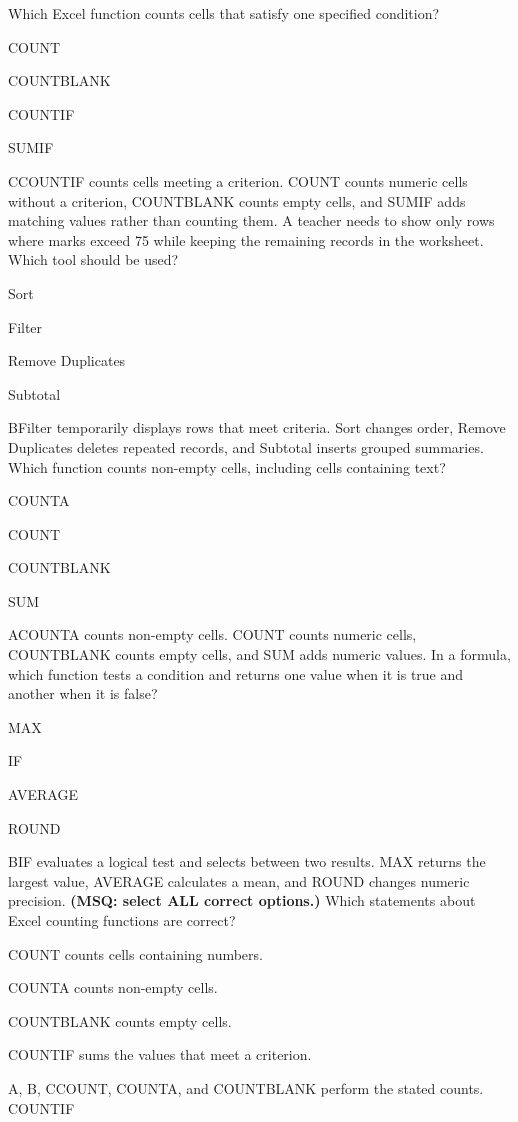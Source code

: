 \begin{enumerate}[label=\textbf{Q\arabic*.}, leftmargin=*]
  {Which Excel function counts cells that satisfy one specified condition?}
  {\item COUNT
   \item COUNTBLANK
   \item COUNTIF
   \item SUMIF}
  {C}{COUNTIF counts cells meeting a criterion. COUNT counts numeric cells
  without a criterion, COUNTBLANK counts empty cells, and SUMIF adds matching
  values rather than counting them.}
  {A teacher needs to show only rows where marks exceed 75 while keeping the
  remaining records in the worksheet. Which tool should be used?}
  {\item Sort
   \item Filter
   \item Remove Duplicates
   \item Subtotal}
  {B}{Filter temporarily displays rows that meet criteria. Sort changes order,
  Remove Duplicates deletes repeated records, and Subtotal inserts grouped
  summaries.}
\JKSSBItem{[Original]}
  {Which function counts non-empty cells, including cells containing text?}
  {\item COUNTA
   \item COUNT
   \item COUNTBLANK
   \item SUM}
  {A}{COUNTA counts non-empty cells. COUNT counts numeric cells, COUNTBLANK
  counts empty cells, and SUM adds numeric values.}
\JKSSBItem{[Original]}
  {In a formula, which function tests a condition and returns one value when it
  is true and another when it is false?}
  {\item MAX
   \item IF
   \item AVERAGE
   \item ROUND}
  {B}{IF evaluates a logical test and selects between two results. MAX returns
  the largest value, AVERAGE calculates a mean, and ROUND changes numeric
  precision.}
  {\textbf{(MSQ: select ALL correct options.)} Which statements about Excel
  counting functions are correct?}
  {\item COUNT counts cells containing numbers.
   \item COUNTA counts non-empty cells.
   \item COUNTBLANK counts empty cells.
   \item COUNTIF sums the values that meet a criterion.}
  {A, B, C}{COUNT, COUNTA, and COUNTBLANK perform the stated counts. COUNTIF
}
\end{enumerate}
